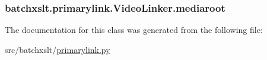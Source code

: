 \subsubsection[{mediaroot}]{\setlength{\rightskip}{0pt plus 5cm}batchxslt.\+primarylink.\+Video\+Linker.\+mediaroot}\label{classbatchxslt_1_1primarylink_1_1_video_linker_a4fbfab2aa675d0721371c723268f285f}


The documentation for this class was generated from the following file\+:\begin{DoxyCompactItemize}
\item 
src/batchxslt/\hyperlink{primarylink_8py}{primarylink.\+py}\end{DoxyCompactItemize}

